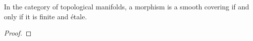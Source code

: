         \begin{lemma} \label{lemma: smooth_coverings_are_finite_etale}
            In the category of topological manifolds, a morphism is a smooth covering if and only if it is finite and \'etale.
        \end{lemma}
            \begin{proof}
                
            \end{proof}